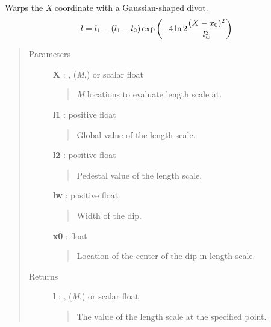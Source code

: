 \documentclass[letterpaper,10pt,english]{sphinxmanual}
\begin{document}

\begin{fulllineitems}
\label{gptools.kernel:gptools.kernel.gibbs.gauss_warp}
Warps the \emph{X} coordinate with a Gaussian-shaped divot.
\begin{gather}
\begin{split}l = l_1 - (l_1 - l_2) \exp\left ( -4\ln 2\frac{(X-x_0)^2}{l_{w}^{2}} \right )\end{split}\notag
\end{gather}\begin{quote}\begin{description}
\item[{Parameters }] \leavevmode
\textbf{X} : , (\emph{M},) or scalar float
\begin{quote}

\emph{M} locations to evaluate length scale at.
\end{quote}

\textbf{l1} : positive float
\begin{quote}

Global value of the length scale.
\end{quote}

\textbf{l2} : positive float
\begin{quote}

Pedestal value of the length scale.
\end{quote}

\textbf{lw} : positive float
\begin{quote}

Width of the dip.
\end{quote}

\textbf{x0} : float
\begin{quote}

Location of the center of the dip in length scale.
\end{quote}

\item[{Returns }] \leavevmode
\textbf{l} : , (\emph{M},) or scalar float
\begin{quote}

The value of the length scale at the specified point.
\end{quote}

\end{description}\end{quote}

\end{fulllineitems}
\end{document}
